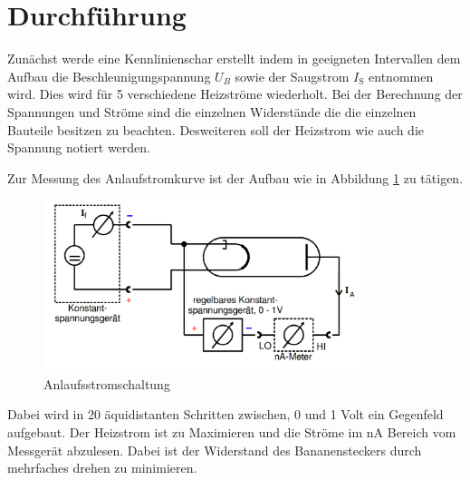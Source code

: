 \section{Durchführung}
\label{sec:Durchführung}
Zunächst werde eine Kennlinienschar erstellt indem in geeigneten Intervallen dem Aufbau die Beschleunigungspannung $U_B$ sowie der Saugstrom $I_\text{S}$ entnommen wird. Dies wird für 5 verschiedene Heizströme wiederholt. Bei der Berechnung der Spannungen und Ströme sind die einzelnen Widerstände die die einzelnen Bauteile besitzen zu beachten. Desweiteren soll der Heizstrom wie auch die Spannung notiert werden.

Zur Messung des Anlaufstromkurve ist der Aufbau wie in Abbildung \ref{fig:Anl} zu tätigen.
\begin{figure}
  \centering
  \includegraphics[height=5cm]{picture/Gegenfeld.png}
  \caption{Anlaufsstromschaltung \cite{pra}}
  \label{fig:Anl}
\end{figure}
Dabei wird in 20 äquidistanten Schritten zwischen, 0 und 1 Volt ein Gegenfeld aufgebaut. Der Heizstrom ist zu Maximieren und die Ströme im nA Bereich vom Messgerät abzulesen. Dabei ist der Widerstand des Bananensteckers durch mehrfaches drehen zu minimieren. 
